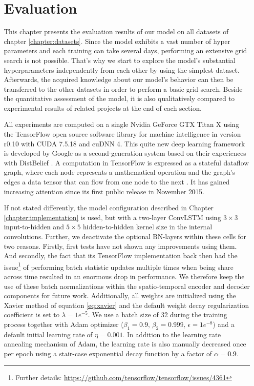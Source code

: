 
\chapter{Evaluation} \label{chapter:evaluation}

This chapter presents the evaluation results of our model on all datasets of chapter \ref{chapter:datasets}. Since the model exhibits a vast number of hyper parameters and each training can take several days, performing an extensive grid search is not possible. That's why we start to explore the model's substantial hyperparameters independently from each other by using the simplest dataset. Afterwards, the acquired knowledge about our model's behavior can then be transferred to the other datasets in order to perform a basic grid search. Beside the quantitative assessment of the model, it is also qualitatively compared to experimental results of related projects at the end of each section.

All experiments are computed on a single Nvidia GeForce GTX Titan X using the TensorFlow open source software library for machine intelligence in version r0.10 with CUDA 7.5.18 and cuDNN 4. This quite new deep learning framework is developed by Google as a second-generation system based on their experiences with DistBelief \parencite{distbelief}. A computation in TensorFlow is expressed as a stateful dataflow graph, where each node represents a mathematical operation and the graph's edges a data tensor that can flow from one node to the next \parencite{tensorflow2015-whitepaper}. It has gained increasing attention since its first public release in November 2015.

If not stated differently, the model configuration described in Chapter \ref{chapter:implementation} is used, but with a two-layer ConvLSTM using $3\times3$ input-to-hidden and $5\times5$ hidden-to-hidden kernel size in the internal convolutions. Further, we deactivate the optional BN-layers within these cells for two reasons. Firstly, first tests have not shown any improvements using them. And secondly, the fact that its TensorFlow implementation back then had the issue\footnote{Further details: \url{https://github.com/tensorflow/tensorflow/issues/4361}} of performing batch statistic updates multiple times when being share across time resulted in an enormous drop in performance. We therefore keep the use of these batch normalizations within the spatio-temporal encoder and decoder components for future work. Additionally, all weights are initialized using the Xavier method of equation \ref{eq:xavier} and the default weight decay regularization coefficient is set to $\lambda=1e^{-5}$. We use a batch size of 32 during the training process together with Adam optimizer ($\beta_1 = 0.9$, $\beta_2 = 0.999$, $\epsilon =1e^{-8}$) and a default initial learning rate of $\eta = 0.001$. In addition to the learning rate annealing mechanism of Adam, the learning rate is also manually decreased once per epoch using a stair-case exponential decay function by a factor of $\alpha=0.9$.


